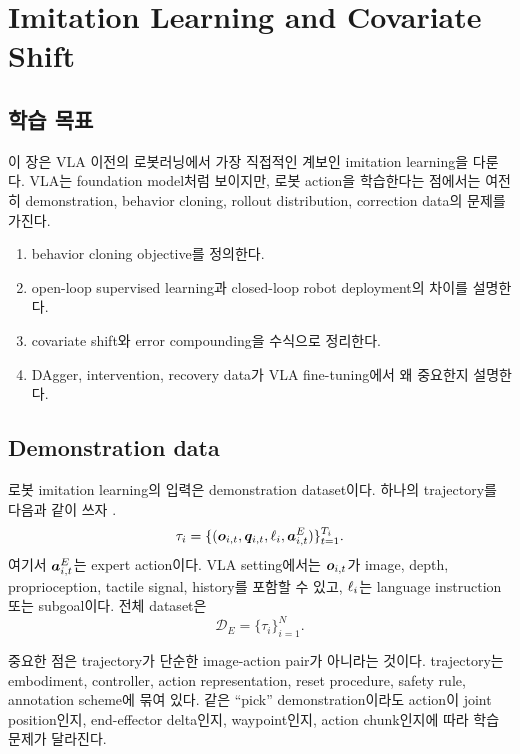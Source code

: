 \chapter{Imitation Learning and Covariate Shift}

\section*{학습 목표}

이 장은 VLA 이전의 로봇러닝에서 가장 직접적인 계보인 imitation learning을 다룬다. VLA는 foundation model처럼 보이지만, 로봇 action을 학습한다는 점에서는 여전히 demonstration, behavior cloning, rollout distribution, correction data의 문제를 가진다.

\begin{enumerate}
  \item behavior cloning objective를 정의한다.
  \item open-loop supervised learning과 closed-loop robot deployment의 차이를 설명한다.
  \item covariate shift와 error compounding을 수식으로 정리한다.
  \item DAgger, intervention, recovery data가 VLA fine-tuning에서 왜 중요한지 설명한다.
\end{enumerate}

\section{Demonstration data}

로봇 imitation learning의 입력은 demonstration dataset이다. 하나의 trajectory를 다음과 같이 쓰자 \cite{ross2011dagger,levine2016gps}.
\begin{equation}
  \tau_i
  =
  \{(\bm{o}_{i,t},\bm{q}_{i,t},\ell_i,\bm{a}^{E}_{i,t})\}_{t=1}^{T_i}.
  \label{eq:demo-trajectory}
\end{equation}
여기서 $\bm{a}^{E}_{i,t}$는 expert action이다. VLA setting에서는 $\bm{o}_{i,t}$가 image, depth, proprioception, tactile signal, history를 포함할 수 있고, $\ell_i$는 language instruction 또는 subgoal이다. 전체 dataset은
\begin{equation}
  \mathcal{D}_{E}
  =
  \{\tau_i\}_{i=1}^{N}.
  \label{eq:expert-dataset}
\end{equation}

중요한 점은 trajectory가 단순한 image-action pair가 아니라는 것이다. trajectory는 embodiment, controller, action representation, reset procedure, safety rule, annotation scheme에 묶여 있다. 같은 ``pick'' demonstration이라도 action이 joint position인지, end-effector delta인지, waypoint인지, action chunk인지에 따라 학습 문제가 달라진다.

